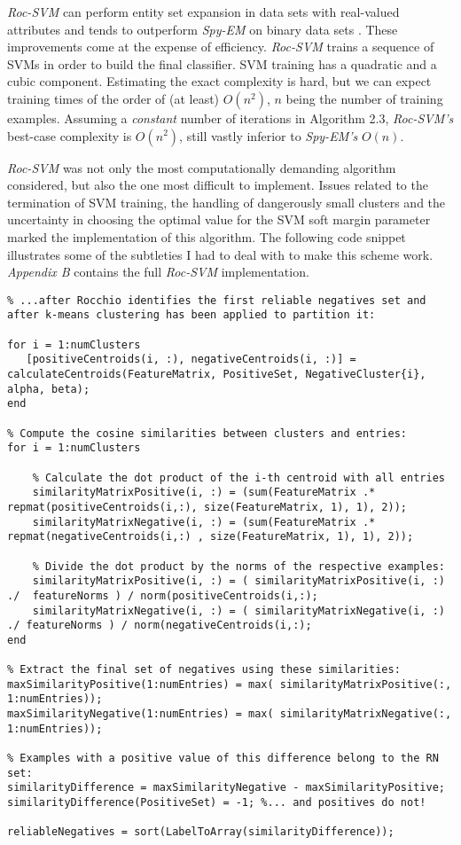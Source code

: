 \documentclass[12pt,twoside,notitlepage,amsart]{report} %
\begin{document}
	 \emph{Roc-SVM} can perform entity set expansion in data sets with real-valued attributes and tends to outperform \emph{Spy-EM} on binary data sets \cite{Li03}. These improvements come at the expense of efficiency. \emph{Roc-SVM} trains a sequence of SVMs in order to build the final classifier. SVM training has a quadratic and a cubic component. Estimating the exact complexity is hard, but we can expect training times of the order of (at least) $O(n^2)$, $n$ being the number of training examples. Assuming a \emph{constant} number of iterations in Algorithm 2.3, \emph{Roc-SVM's} best-case complexity is $O(n^2)$, still vastly inferior to \emph{Spy-EM's} $O(n)$.

\emph{Roc-SVM} was not only the most computationally demanding algorithm considered, but also the one most difficult to implement. Issues related to the termination of SVM training, the handling of dangerously small clusters and the uncertainty in choosing the optimal value for the SVM soft margin parameter marked the implementation of this algorithm. The following code snippet illustrates some of the subtleties I had to deal with to make this scheme work. \emph{Appendix B} contains the full \emph{Roc-SVM} implementation.

\begin{lstlisting} 
% ...after Rocchio identifies the first reliable negatives set and after k-means clustering has been applied to partition it:

for i = 1:numClusters 
   [positiveCentroids(i, :), negativeCentroids(i, :)] = calculateCentroids(FeatureMatrix, PositiveSet, NegativeCluster{i}, alpha, beta);
end

% Compute the cosine similarities between clusters and entries:
for i = 1:numClusters

    % Calculate the dot product of the i-th centroid with all entries
    similarityMatrixPositive(i, :) = (sum(FeatureMatrix .* repmat(positiveCentroids(i,:), size(FeatureMatrix, 1), 1), 2));
    similarityMatrixNegative(i, :) = (sum(FeatureMatrix .* repmat(negativeCentroids(i,:) , size(FeatureMatrix, 1), 1), 2));

    % Divide the dot product by the norms of the respective examples:
    similarityMatrixPositive(i, :) = ( similarityMatrixPositive(i, :) ./  featureNorms ) / norm(positiveCentroids(i,:);
    similarityMatrixNegative(i, :) = ( similarityMatrixNegative(i, :) ./ featureNorms ) / norm(negativeCentroids(i,:);
end

% Extract the final set of negatives using these similarities:
maxSimilarityPositive(1:numEntries) = max( similarityMatrixPositive(:, 1:numEntries)); 
maxSimilarityNegative(1:numEntries) = max( similarityMatrixNegative(:, 1:numEntries));

% Examples with a positive value of this difference belong to the RN set:
similarityDifference = maxSimilarityNegative - maxSimilarityPositive;
similarityDifference(PositiveSet) = -1; %... and positives do not!

reliableNegatives = sort(LabelToArray(similarityDifference));
\end{lstlisting}
\clearpage
	
\end{document}
